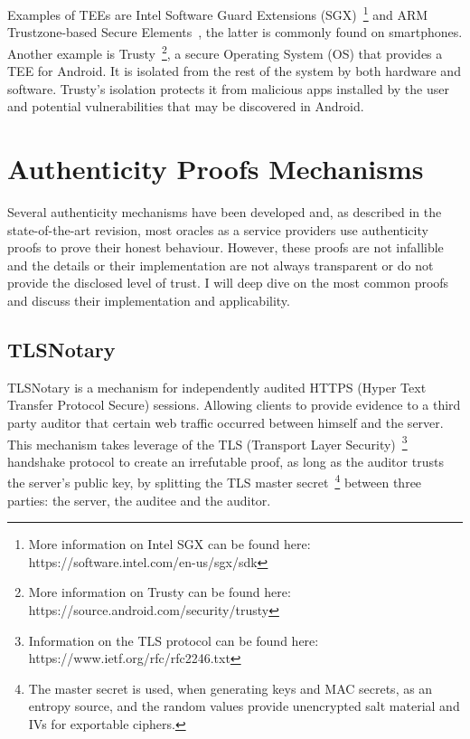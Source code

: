 Examples of TEEs are Intel Software Guard Extensions (SGX)~\footnote{More information on Intel SGX can be found here: https://software.intel.com/en-us/sgx/sdk} and ARM Trustzone-based Secure Elements~\citet{Bunz2018}, the latter is commonly found on smartphones. Another example is Trusty~\footnote{More information on Trusty can be found here: https://source.android.com/security/trusty}, a secure Operating System (OS) that provides a TEE for Android. It is isolated from the rest of the system by both hardware and software. Trusty's isolation protects it from malicious apps installed by the user and potential vulnerabilities that may be discovered in Android.


\section{Authenticity Proofs Mechanisms}

Several authenticity mechanisms have been developed and, as described in the state-of-the-art revision, most oracles as a service providers use authenticity proofs to prove their honest behaviour. However, these proofs are not infallible and the details or their implementation are not always transparent or do not provide the disclosed level of trust. I will deep dive on the most common proofs and discuss their implementation and applicability.

\subsection{TLSNotary}\label{proof:TLSNotary}

TLSNotary is a mechanism for independently audited HTTPS (Hyper Text Transfer Protocol Secure) sessions. Allowing clients to provide evidence to a third party auditor that certain web traffic occurred between himself and the server. This mechanism takes leverage of the TLS (Transport Layer Security)~\footnote{Information on the TLS protocol can be found here: https://www.ietf.org/rfc/rfc2246.txt} handshake protocol to create an irrefutable proof, as long as the auditor trusts the server's public key, by splitting the TLS master secret~\footnote{The master secret is used, when generating keys and MAC secrets, as an entropy source, and the random values provide unencrypted salt material and IVs for exportable ciphers.} between three parties: the server, the auditee and the auditor.


